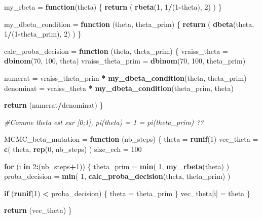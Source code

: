 \documentclass[]{article}
\newenvironment{Shaded}{\begin{snugshade}}{\end{snugshade}}
\newcommand{\CommentTok}[1]{\textcolor[rgb]{0.56,0.35,0.01}{\textit{#1}}}
\newcommand{\ControlFlowTok}[1]{\textcolor[rgb]{0.13,0.29,0.53}{\textbf{#1}}}
\newcommand{\DecValTok}[1]{\textcolor[rgb]{0.00,0.00,0.81}{#1}}
\newcommand{\KeywordTok}[1]{\textcolor[rgb]{0.13,0.29,0.53}{\textbf{#1}}}
\newcommand{\NormalTok}[1]{#1}
\newcommand{\OperatorTok}[1]{\textcolor[rgb]{0.81,0.36,0.00}{\textbf{#1}}}
\newcommand{\StringTok}[1]{\textcolor[rgb]{0.31,0.60,0.02}{#1}}
\begin{document}
\begin{Shaded}
\begin{Highlighting}[]
\NormalTok{my_rbeta =}\StringTok{ }\ControlFlowTok{function}\NormalTok{(theta) \{ }\KeywordTok{return}\NormalTok{ ( }\KeywordTok{rbeta}\NormalTok{(}\DecValTok{1}\NormalTok{, }\DecValTok{1}\OperatorTok{/}\NormalTok{(}\DecValTok{1}\OperatorTok{-}\NormalTok{theta), }\DecValTok{2}\NormalTok{) ) \}}

\NormalTok{my_dbeta_condition =}\StringTok{ }\ControlFlowTok{function}\NormalTok{ (theta, theta_prim)}
\NormalTok{\{}
  \KeywordTok{return}\NormalTok{ ( }\KeywordTok{dbeta}\NormalTok{(theta, }\DecValTok{1}\OperatorTok{/}\NormalTok{(}\DecValTok{1}\OperatorTok{-}\NormalTok{theta_prim), }\DecValTok{2}\NormalTok{) )}
\NormalTok{\}}

\NormalTok{calc_proba_decision =}\StringTok{ }\ControlFlowTok{function}\NormalTok{ (theta, theta_prim)}
\NormalTok{\{}
\NormalTok{  vraiss_theta =}\StringTok{ }\KeywordTok{dbinom}\NormalTok{(}\DecValTok{70}\NormalTok{, }\DecValTok{100}\NormalTok{, theta)}
\NormalTok{  vraiss_theta_prim =}\StringTok{ }\KeywordTok{dbinom}\NormalTok{(}\DecValTok{70}\NormalTok{, }\DecValTok{100}\NormalTok{, theta_prim)}
  
\NormalTok{  numerat =}\StringTok{ }\NormalTok{vraiss_theta_prim }\OperatorTok{*}\StringTok{ }\KeywordTok{my_dbeta_condition}\NormalTok{(theta, theta_prim)}
\NormalTok{  denominat =}\StringTok{ }\NormalTok{vraiss_theta }\OperatorTok{*}\StringTok{ }\KeywordTok{my_dbeta_condition}\NormalTok{(theta_prim, theta)}
  
  \KeywordTok{return}\NormalTok{ (numerat}\OperatorTok{/}\NormalTok{denominat)}
\NormalTok{\}}

\CommentTok{#Comme theta est sur [0;1], pi(theta) = 1 = pi(theta_prim) ??}

\NormalTok{MCMC_beta_mutation =}\StringTok{ }\ControlFlowTok{function}\NormalTok{ (nb_steps)}
\NormalTok{\{}
\NormalTok{  theta =}\StringTok{ }\KeywordTok{runif}\NormalTok{(}\DecValTok{1}\NormalTok{)}
\NormalTok{  vec_theta =}\StringTok{ }\KeywordTok{c}\NormalTok{( theta, }\KeywordTok{rep}\NormalTok{(}\DecValTok{0}\NormalTok{, nb_steps) )}
\NormalTok{  size_ech =}\StringTok{ }\DecValTok{100}
  
  \ControlFlowTok{for}\NormalTok{ (i }\ControlFlowTok{in} \DecValTok{2}\OperatorTok{:}\NormalTok{(nb_steps}\OperatorTok{+}\DecValTok{1}\NormalTok{))}
\NormalTok{  \{}
\NormalTok{    theta_prim =}\StringTok{ }\KeywordTok{min}\NormalTok{( }\DecValTok{1}\NormalTok{, }\KeywordTok{my_rbeta}\NormalTok{(theta) )}
\NormalTok{    proba_decision =}\StringTok{ }\KeywordTok{min}\NormalTok{( }\DecValTok{1}\NormalTok{, }\KeywordTok{calc_proba_decision}\NormalTok{(theta, theta_prim) )}

    \ControlFlowTok{if}\NormalTok{ (}\KeywordTok{runif}\NormalTok{(}\DecValTok{1}\NormalTok{) }\OperatorTok{<}\StringTok{ }\NormalTok{proba_decision) \{ theta =}\StringTok{ }\NormalTok{theta_prim \}}
\NormalTok{    vec_theta[i] =}\StringTok{ }\NormalTok{theta}
\NormalTok{  \}}
  
  \KeywordTok{return}\NormalTok{ (vec_theta)}
\NormalTok{\}}
\end{Highlighting}
\end{Shaded}
\end{document}

